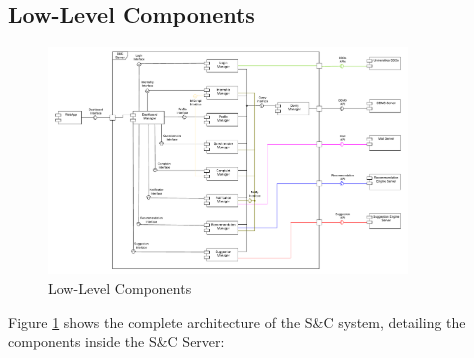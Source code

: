 \subsection{Low-Level Components}
\label{sub:low-level-components}%

\begin{figure}[H]
      \centering
      \includegraphics[width=0.85\textwidth]{Images/Low_Level_Architectural_Design.pdf}
      \caption{Low-Level Components}
      \label{fig:low-level-components}
\end{figure}

\par Figure \ref{fig:low-level-components} shows the complete architecture of the S\&C system, detailing the components inside the S\&C Server:

